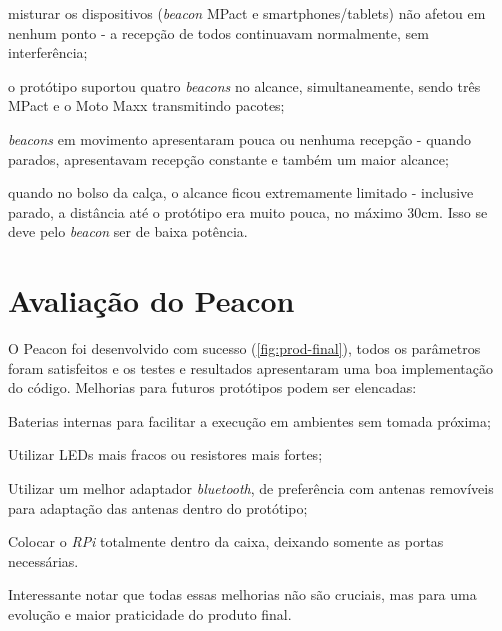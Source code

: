 \begin{alineas}
	\item misturar os dispositivos (\textit{beacon} MPact e smartphones/tablets) não afetou em nenhum ponto - a recepção de todos continuavam normalmente, sem interferência;
	\item o protótipo suportou quatro \textit{beacons} no alcance, simultaneamente, sendo três MPact e o Moto Maxx transmitindo pacotes;
	\item \textit{beacons} em movimento apresentaram pouca ou nenhuma recepção - quando parados, apresentavam recepção constante e também um maior alcance;
	\item quando no bolso da calça, o alcance ficou extremamente limitado - inclusive parado, a distância até o protótipo era muito pouca, no máximo 30cm. Isso se deve pelo \textit{beacon} ser de baixa potência.
\end{alineas}

\section{Avaliação do Peacon}\label{sec:prototipo-final}

O Peacon foi desenvolvido com sucesso (\autoref{fig:prod-final}), todos os parâmetros foram satisfeitos e os testes e resultados apresentaram uma boa implementação do código. Melhorias para futuros protótipos podem ser elencadas:

\begin{alineas}
	\item Baterias internas para facilitar a execução em ambientes sem tomada próxima;
	\item Utilizar LEDs mais fracos ou resistores mais fortes;
	\item Utilizar um melhor adaptador \textit{bluetooth}, de preferência com antenas removíveis para adaptação das antenas dentro do protótipo;
	\item Colocar o \textit{RPi} totalmente dentro da caixa, deixando somente as portas necessárias.
\end{alineas}

Interessante notar que todas essas melhorias não são cruciais, mas para uma evolução e maior praticidade do produto final.

